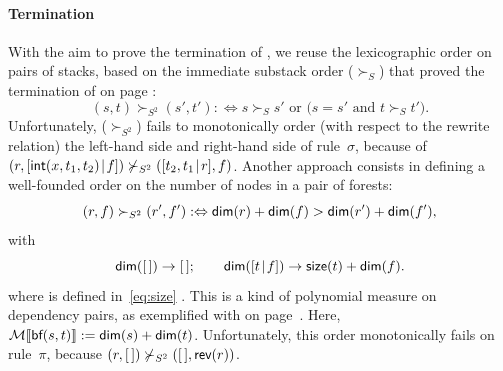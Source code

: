 \paragraph{Termination}
  With the aim to prove the termination of
, we reuse the lexicographic order on
pairs of stacks, based on the immediate substack order
(\(\succ_{S}\)) that proved
the termination of  on page
\pageref{merging_termination}:
\begin{equation*}
(s,t) \succ_{S^2} (s',t') :\Leftrightarrow \text{\(s \succ_{S} s'\) or
    (\(s = s'\) and \(t \succ_{S} t'\))}.
\end{equation*}
Unfortunately, (\(\succ_{S^2}\)) fails to monotonically order (with
respect to the rewrite relation) the left\hyp{}hand side and
right\hyp{}hand side of rule~\(\sigma\), because of
\((r,[{\textsf{int}(x,t_1,t_2)}\!\mid\!{f}]) \nsucc_{S^2}
([{t_2,t_1}\!\mid\!{r}],f)\). Another approach consists in defining a
well\hyp{}founded order on the number of nodes in a pair of forests:
\begin{equation*}
(r,f) \succ_{S^2} (r',f') :\Leftrightarrow \textsf{dim}(r) +
  \textsf{dim}(f) > \textsf{dim}(r') + \textsf{dim}(f'),
\end{equation*}
with
\begin{equation*}
\textsf{dim}([\,]) \rightarrow [\,];\qquad
\textsf{dim}([{t}\!\mid\!{f}]) \rightarrow \textsf{size}(t) + \textsf{dim}(f).
\end{equation*}
where  is
defined in~\eqref{eq:size} . This is a kind of
polynomial measure on dependency
pairs, as exemplified with
 on
page~\pageref{flattening:termination}. Here, \(\mathcal{M}\llbracket{\textsf{bf}(s,t)}\rrbracket
:= \textsf{dim}(s) + \textsf{dim}(t)\). Unfortunately, this order
monotonically fails on rule~\(\pi\), because \((r,[\,]) \nsucc_{S^2}
([\,],\textsf{rev}(r))\).

